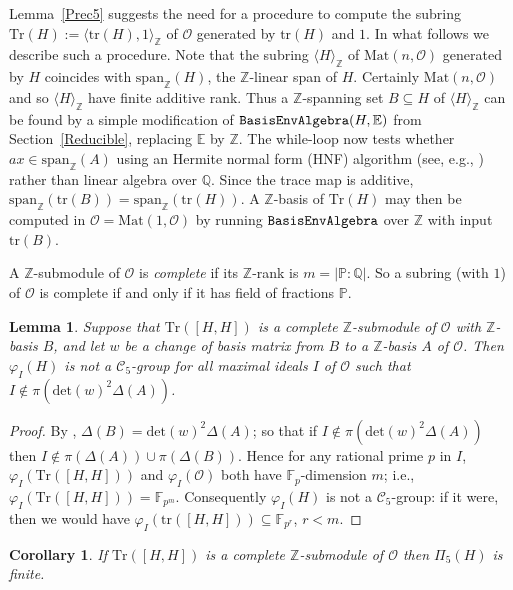\documentclass[11pt]{amsart}
\newtheorem{lemma}[theorem]{Lemma}
\newtheorem{corollary}[theorem]{Corollary}
\theoremstyle{definition}
\theoremstyle{remark}
\newcommand{\F}{\mathbb{F}}
\newcommand{\Z}{\mathbb{Z}}
\newcommand{\Q}{\mathbb{Q}}
\renewcommand{\P}{\mathbb{P}}
\newcommand{\tr}{\mathrm{tr}}
\newcommand{\calc}{\mathscr{C}}
\begin{document}
 Lemma~\ref{Prec5} suggests the need for a procedure to compute 
the subring $\mathrm{Tr}(H):= \langle \tr(H),1\rangle_\Z$ of 
$\mathcal O$ generated by $\tr(H)$ and $1$. In what follows we 
describe such a procedure.
 Note that the subring $\langle H \rangle_{\Z}$ of 
$\mathrm{Mat}(n,\mathcal{O})$ generated by $H$ coincides with
 $\mathrm{span}_\Z(H)$, the $\Z$-linear span of $H$. Certainly 
$\mathrm{Mat}(n,\mathcal{O})$ and so $\langle H \rangle_{\Z}$ 
have finite additive rank. Thus a $\Z$-spanning set $B\subseteq H$ 
of $\langle H \rangle_{\Z}$ can be found by a simple modification 
of ${\tt BasisEnvAlgebra}(H,\mathbb{E})$ from 
Section~\ref{Reducible}, replacing $\mathbb{E}$ by $\Z$.
The while-loop now tests whether $ax\in \mathrm{span}_\Z(A)$
 using an Hermite normal form (HNF) algorithm (see, e.g., 
\cite[Section~9.3]{Handbook}) rather than linear algebra over 
$\Q$. 
Since the trace map is additive,  
$\mathrm{span}_\Z(\tr(B)) = \allowbreak \mathrm{span}_\Z(\tr(H))$.
A $\Z$-basis of $\mathrm{Tr}(H)$ may then be computed in 
$\mathcal{O}=\allowbreak \mathrm{Mat}(1,\mathcal O)$ 
by running $\tt BasisEnvAlgebra$ over $\Z$ with input $\tr(B)$.

A $\Z$-submodule of $\mathcal O$ is \emph{complete} if its 
$\Z$-rank is $m=|\P:\Q|$. So a subring (with $1$) of $\mathcal O$ 
is complete if and only if it has field of fractions $\P$.
\begin{lemma} 
\label{FullRank}
Suppose that $\mathrm{Tr}([H,H])$ is a complete $\Z$-submodule 
of $\mathcal{O}$ with $\Z$-basis $B$, and let $w$ be a change 
of basis matrix from $B$ to a $\Z$-basis $A$ of $\mathcal O$.
Then $\varphi_I(H)$ is not a $\calc_5$-group for all maximal 
ideals $I$ of $\mathcal{O}$ such that 
$I \notin \pi(\mathrm{det}(w)^2\Delta(A))$.
\end{lemma}
\begin{proof}
By \cite[(2.4.1), p.~43]{Koch}, $\Delta(B) = 
\mathrm{det}(w)^2\Delta(A)$; so that if $I \notin 
\pi(\mathrm{det}(w)^2\Delta(A))$ then $I\not \in 
 \allowbreak \pi(\Delta(A) ) \cup \allowbreak \pi( \Delta(B))$.
Hence for any rational prime $p$ in $I$, 
$\varphi_I(\mathrm{Tr}([H,H]))$ and $\varphi_I(\mathcal{O})$ 
both have $\F_p$-dimension $m$; i.e., 
$\varphi_I(\mathrm{Tr}([H,H])) = \F_{p^m}$. Consequently 
$\varphi_I(H)$ is not a $\calc_5$-group: if it were, then we 
would have $\varphi_I(\mathrm{tr}([H,H]))\subseteq \F_{p^r}$, 
$r < m$. 
\end{proof}
\begin{corollary} 
\label{Pi5}
If $\mathrm{Tr}([H,H])$ is a complete $\Z$-submodule of 
$\mathcal{O}$ then $\Pi_5(H)$ is finite.
\end{corollary}
\end{document}
